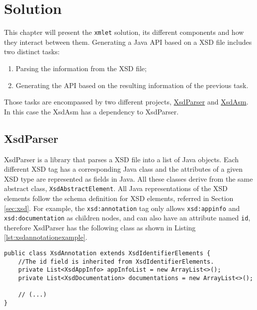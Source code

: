 \chapter{Solution}
\label{cha:solution}

\sloppy

This chapter will present the \texttt{xmlet} solution, its different components and how they interact between them. Generating a Java \ac{API} based on a \ac{XSD} file includes two distinct tasks:

\begin{enumerate}
\item Parsing the information from the \ac{XSD} file;
\item Generating the \ac{API} based on the resulting information of the previous task.
\end{enumerate}

\noindent
Those tasks are encompassed by two different projects, \hyperref[sec:xsdparser]{XsdParser} and \hyperref[sec:xsdasm]{XsdAsm}. In this case the XsdAsm has a dependency to XsdParser.

\section{XsdParser} %
\label{sec:xsdparser}

XsdParser is a library that parses a \ac{XSD} file into a list of Java objects. Each different \ac{XSD} tag has a corresponding Java class and the  attributes of a given \ac{XSD} type are represented as fields in Java. All these classes derive from the same abstract class, \texttt{XsdAbstractElement}. All Java representations of the \ac{XSD} elements follow the schema definition for \ac{XSD} elements, referred in Section \ref{sec:xsd}. For example, the \texttt{xsd:annotation} tag only allows \texttt{xsd:appinfo} and \texttt{xsd:documentation} as children nodes, and can also have an attribute named \texttt{id}, therefore XsdParser has the following class as shown in Listing \ref{lst:xsdannotationexample}.

\bigskip


\begin{minipage}{\linewidth}
\begin{lstlisting}[caption={XsdAnnotation class (Simplified)}, label={lst:xsdannotationexample}]
public class XsdAnnotation extends XsdIdentifierElements {
    //The id field is inherited from XsdIdentifierElements.
    private List<XsdAppInfo> appInfoList = new ArrayList<>();
    private List<XsdDocumentation> documentations = new ArrayList<>();
    
    // (...)
}
\end{lstlisting}
\end{minipage}

